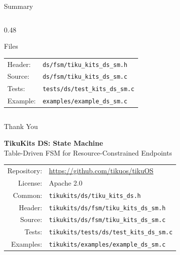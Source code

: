 \documentclass[aspectratio=169, 10pt]{beamer}
\begin{document}
\begin{frame}{Summary}
\begin{columns}[T]
\begin{column}{0.48\textwidth}
\begin{block}{Files}
\scriptsize
\begin{tabular}{@{}lp{4.5cm}@{}}
Header: & \texttt{ds/fsm/tiku\_kits\_ds\_sm.h} \\
Source: & \texttt{ds/fsm/tiku\_kits\_ds\_sm.c} \\
Tests: & \texttt{tests/ds/test\_kits\_ds\_sm.c} \\
Example: & \texttt{examples/example\_ds\_sm.c} \\
\end{tabular}
\end{block}
\end{column}
\end{columns}
\end{frame}

\begin{frame}{Thank You}
\begin{center}
\Large\textbf{TikuKits DS: State Machine}\\[0.5em]
\normalsize Table-Driven FSM for Resource-Constrained Endpoints\\[1.5em]

\begin{tabular}{rl}
  Repository: & \url{https://github.com/tikuos/tikuOS} \\
  License:    & Apache 2.0 \\
  Common:     & \texttt{tikukits/ds/tiku\_kits\_ds.h} \\
  Header:     & \texttt{tikukits/ds/fsm/tiku\_kits\_ds\_sm.h} \\
  Source:     & \texttt{tikukits/ds/fsm/tiku\_kits\_ds\_sm.c} \\
  Tests:      & \texttt{tikukits/tests/ds/test\_kits\_ds\_sm.c} \\
  Examples:   & \texttt{tikukits/examples/example\_ds\_sm.c} \\
\end{tabular}
\end{center}
\end{frame}
\end{document}
